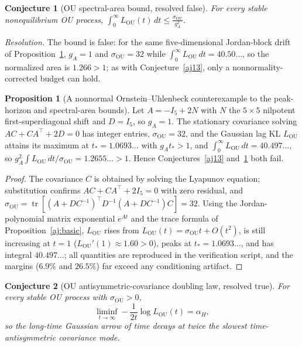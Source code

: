 \documentclass[11pt]{article}
\newtheorem{conjecture}{Conjecture}
\theoremstyle{definition}
\newtheorem{proposition}{Proposition}
\begin{document}
\begin{conjecture}[OU spectral-area bound, resolved false]\label{aj14}
For every stable nonequilibrium OU process, $\displaystyle\int_0^\infty L_{\mathrm{OU}}(t)\,dt\le\frac{\sigma_{\mathrm{OU}}}{g_A^2}$.
\end{conjecture}

\emph{Resolution.} The bound is false: for the same five-dimensional Jordan-block drift of Proposition~\ref{aj:c1314}, $g_A=1$ and $\sigma_{\mathrm{OU}}=32$ while $\int_0^\infty L_{\mathrm{OU}}\,dt=40.50\ldots$, so the normalized area is $1.266>1$; as with Conjecture~\ref{aj13}, only a nonnormality-corrected budget can hold.

\begin{proposition}[A nonnormal Ornstein--Uhlenbeck counterexample to the peak-horizon and spectral-area bounds]\label{aj:c1314}
Let $A=-I_5+2N$ with $N$ the $5\times5$ nilpotent first-superdiagonal shift and $D=I_5$, so $g_A=1$.  The stationary covariance solving $AC+CA^\top+2D=0$ has integer entries, $\sigma_{\mathrm{OU}}=32$, and the Gaussian lag KL $L_{\mathrm{OU}}$ attains its maximum at $t_*=1.0693\ldots$ with $g_At_*>1$, and $\int_0^\infty L_{\mathrm{OU}}\,dt=40.497\ldots$, so $g_A^2\!\int L_{\mathrm{OU}}\,dt/\sigma_{\mathrm{OU}}=1.2655\ldots>1$.  Hence Conjectures~\ref{aj13} and~\ref{aj14} both fail.
\end{proposition}

\begin{proof}
The covariance $C$ is obtained by solving the Lyapunov equation; substitution confirms $AC+CA^\top+2I_5=0$ with zero residual, and $\sigma_{\mathrm{OU}}=\operatorname{tr}[(A+DC^{-1})^\top D^{-1}(A+DC^{-1})C]=32$.  Using the Jordan-polynomial matrix exponential $e^{At}$ and the trace formula of Proposition~\ref{aj:basic}, $L_{\mathrm{OU}}$ rises from $L_{\mathrm{OU}}(t)=\sigma_{\mathrm{OU}}t+O(t^2)$, is still increasing at $t=1$ ($L_{\mathrm{OU}}'(1)\approx1.60>0$), peaks at $t_*=1.0693\ldots$, and has integral $40.497\ldots$; all quantities are reproduced in the verification script, and the margins ($6.9\%$ and $26.5\%$) far exceed any conditioning artifact.
\end{proof}

\begin{conjecture}[OU antisymmetric-covariance doubling law, resolved true]\label{aj15}
For every stable OU process with $\sigma_{\mathrm{OU}}>0$,
\[
\liminf_{t\to\infty}-\frac1{2t}\log L_{\mathrm{OU}}(t)=\alpha_H,
\]
so the long-time Gaussian arrow of time decays at twice the slowest time-antisymmetric covariance mode.
\end{conjecture}
\end{document}
